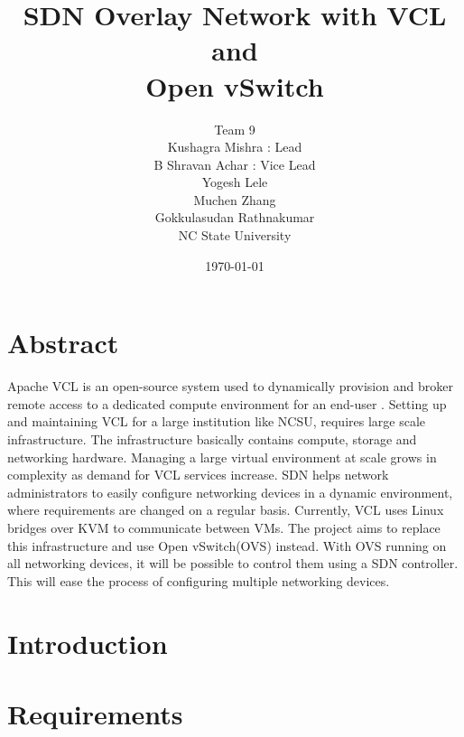 \documentclass{article}
\title{SDN Overlay Network with VCL and \\Open vSwitch}
\date{\today}
\author{Team 9 \\Kushagra Mishra : Lead\\
B Shravan Achar : Vice Lead \\ Yogesh Lele \\ Muchen Zhang \\ Gokkulasudan Rathnakumar\\ NC State University}
\begin{document}
\maketitle
\tableofcontents
\newpage

\section{Abstract}
Apache VCL is an open-source system used to dynamically provision and broker remote access to a dedicated compute environment for an end-user \cite{vcl}. Setting up and maintaining VCL for a large institution like NCSU, requires large scale infrastructure. The infrastructure basically contains compute, storage and networking hardware. Managing a large virtual environment at scale grows in complexity as demand for VCL services increase. SDN helps network administrators to easily configure networking devices in a dynamic environment, where requirements are changed on a regular basis. Currently, VCL uses Linux bridges over KVM to communicate between VMs. The project aims to replace this infrastructure and use Open vSwitch(OVS) instead. With OVS running on all networking devices, it will be possible to control them using a SDN controller. This will ease the process of configuring multiple networking devices.



\section{Introduction}


\section{Requirements}
\end{document}
